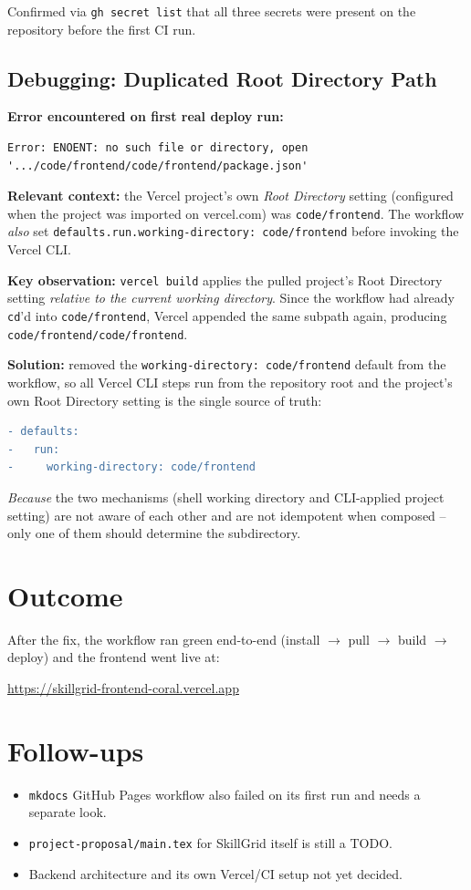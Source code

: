 \documentclass[11pt,a4paper]{article}
\begin{document}
Confirmed via \texttt{gh secret list} that all three secrets
were present on the repository before the first CI run.

\subsection{Debugging: Duplicated Root Directory Path}
\textbf{Error encountered on first real deploy run:}
\begin{lstlisting}
Error: ENOENT: no such file or directory, open
'.../code/frontend/code/frontend/package.json'
\end{lstlisting}

\textbf{Relevant context:} the Vercel project's own
\emph{Root Directory} setting (configured when the project
was imported on vercel.com) was \texttt{code/frontend}.
The workflow \emph{also} set
\texttt{defaults.run.working-directory: code/frontend}
before invoking the Vercel CLI.

\textbf{Key observation:} \texttt{vercel build} applies the
pulled project's Root Directory setting \emph{relative to
the current working directory}. Since the workflow had
already \texttt{cd}'d into \texttt{code/frontend}, Vercel
appended the same subpath again, producing
\texttt{code/frontend/code/frontend}.

\textbf{Solution:} removed the
\texttt{working-directory: code/frontend} default from the
workflow, so all Vercel CLI steps run from the repository
root and the project's own Root Directory setting is the
single source of truth:
\begin{lstlisting}[language=diff]
- defaults:
-   run:
-     working-directory: code/frontend
\end{lstlisting}

\emph{Because} the two mechanisms (shell working directory
and CLI-applied project setting) are not aware of each
other and are not idempotent when composed -- only one of
them should determine the subdirectory.

\section{Outcome}
After the fix, the workflow ran green end-to-end (install
$\to$ pull $\to$ build $\to$ deploy) and the frontend went
live at:
\begin{center}
  \url{https://skillgrid-frontend-coral.vercel.app}
\end{center}

\section{Follow-ups}
\begin{itemize}[leftmargin=0.7cm]
  \item \texttt{mkdocs} GitHub Pages workflow also failed
    on its first run and needs a separate look.
  \item \texttt{project-proposal/main.tex} for SkillGrid
    itself is still a TODO.
  \item Backend architecture and its own Vercel/CI setup
    not yet decided.
\end{itemize}
\end{document}
